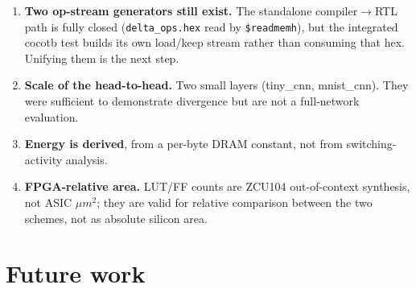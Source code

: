 \documentclass[11pt,a4paper]{article}
\newcommand{\file}[1]{\texttt{\small #1}}
\begin{document}
\begin{enumerate}[leftmargin=1.6em,itemsep=5pt]
        word-addressed with \file{PAGE\_SIZE\_BITS=10} for self-consistency.
  \item \textbf{Two op-stream generators still exist.} The standalone
        compiler$\to$RTL path is fully closed (\file{delta\_ops.hex} read by
        \file{\$readmemh}), but the integrated cocotb test builds its own
        load/keep stream rather than consuming that hex. Unifying them is the
        next step.
  \item \textbf{Scale of the head-to-head.} Two small layers (tiny\_cnn,
        mnist\_cnn). They were sufficient to demonstrate divergence but are not
        a full-network evaluation.
  \item \textbf{Energy is derived}, from a per-byte DRAM constant, not from
        switching-activity analysis.
  \item \textbf{FPGA-relative area.} LUT/FF counts are ZCU104 out-of-context
        synthesis, not ASIC $\mu m^2$; they are valid for relative comparison
        between the two schemes, not as absolute silicon area.
\end{enumerate}

\section{Future work}
\end{document}
